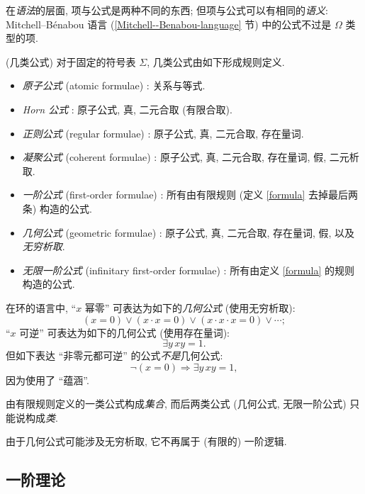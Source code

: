 \begin{remark}
	{}
	在\emph{语法}的层面, 项与公式是两种不同的东西; 但项与公式可以有相同的\emph{语义}: Mitchell--B\'enabou 语言 (\ref{Mitchell--Benabou-language} 节) 中的公式不过是 $\Omega$ 类型的项.
\end{remark}



\begin{definition}
	[label={kinds-of-formulae}]
	{(几类公式)}
	对于固定的符号表 $\Sigma$,
	几类公式由如下形成规则定义.
	\begin{itemize}
		\item \emph{原子公式} (atomic formulae) : 关系与等式.
		\item \emph{Horn 公式}\footnotemark{} : 原子公式, 真, 二元合取 (有限合取).
		\item \emph{正则公式} (regular formulae) : 原子公式, 真, 二元合取, 存在量词.
		\item \emph{凝聚公式} (coherent formulae) : 原子公式, 真, 二元合取, 存在量词, 假, 二元析取.
		\item \emph{一阶公式} (first-order formulae) : 所有由有限规则 (定义 \ref{formula} 去掉最后两条) 构造的公式.
		\item \emph{几何公式} (geometric formulae) : 原子公式, 真, 二元合取, 存在量词, 假, 以及\emph{无穷析取}.
		\item \emph{无限一阶公式} (infinitary first-order formulae) : 所有由定义 \ref{formula} 的规则构造的公式.
	\end{itemize}
\end{definition}

\begin{example}
	{}
	在环的语言中, ``$x$ 幂零'' 可表达为如下的\emph{几何公式} (使用无穷析取):
	$$
	(x=0)\lor (x\cdot x=0) \lor (x\cdot x\cdot x=0)\lor\cdots;
	$$
	``$x$ 可逆'' 可表达为如下的几何公式 (使用存在量词):
	$$
	\exists y\, xy= 1.
	$$
	但如下表达 ``非零元都可逆'' 的公式\emph{不是}几何公式:
	$$
	\neg(x=0) \Rightarrow \exists y\,xy=1,
	$$
	因为使用了 ``蕴涵''.
\end{example}

\begin{remark}
	{}
	由有限规则定义的一类公式构成\emph{集合}, 而后两类公式 (几何公式, 无限一阶公式) 只能说构成\emph{类}.
	
	由于几何公式可能涉及无穷析取, 它不再属于 (有限的) 一阶逻辑.
\end{remark}

\subsection{一阶理论}

